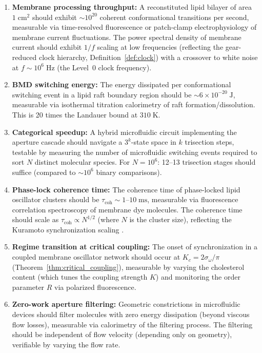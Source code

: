 \documentclass[twocolumn,10pt]{article}
\theoremstyle{remark}
\begin{document}
\begin{enumerate}
\item \textbf{Membrane processing throughput:} A reconstituted lipid bilayer of area $1\;\mathrm{cm}^2$ should exhibit $\sim 10^{20}$ coherent conformational transitions per second, measurable via time-resolved fluorescence or patch-clamp electrophysiology of membrane current fluctuations. The power spectral density of membrane current should exhibit $1/f$ scaling at low frequencies (reflecting the gear-reduced clock hierarchy, Definition~\ref{def:clock}) with a crossover to white noise at $f \sim 10^6\;\mathrm{Hz}$ (the Level~0 clock frequency).

\item \textbf{BMD switching energy:} The energy dissipated per conformational switching event in a lipid raft boundary region should be $\sim 6 \times 10^{-20}\;\mathrm{J}$, measurable via isothermal titration calorimetry of raft formation/dissolution. This is 20 times the Landauer bound at $310\;\mathrm{K}$.

\item \textbf{Categorical speedup:} A hybrid microfluidic circuit implementing the aperture cascade should navigate a $3^k$-state space in $k$ trisection steps, testable by measuring the number of microfluidic switching events required to sort $N$ distinct molecular species. For $N = 10^6$: 12--13 trisection stages should suffice (compared to $\sim 10^6$ binary comparisons).

\item \textbf{Phase-lock coherence time:} The coherence time of phase-locked lipid oscillator clusters should be $\tau_{\mathrm{coh}} \sim 1$--$10\;\mathrm{ms}$, measurable via fluorescence correlation spectroscopy of membrane dye molecules. The coherence time should scale as $\tau_{\mathrm{coh}} \propto N^{1/2}$ (where $N$ is the cluster size), reflecting the Kuramoto synchronization scaling \cite{strogatz2000}.

\item \textbf{Regime transition at critical coupling:} The onset of synchronization in a coupled membrane oscillator network should occur at $K_c = 2\sigma_\omega / \pi$ (Theorem~\ref{thm:critical_coupling}), measurable by varying the cholesterol content (which tunes the coupling strength $K$) and monitoring the order parameter $R$ via polarized fluorescence.

\item \textbf{Zero-work aperture filtering:} Geometric constrictions in microfluidic devices should filter molecules with zero energy dissipation (beyond viscous flow losses), measurable via calorimetry of the filtering process. The filtering should be independent of flow velocity (depending only on geometry), verifiable by varying the flow rate.


\end{enumerate}
\end{document}
